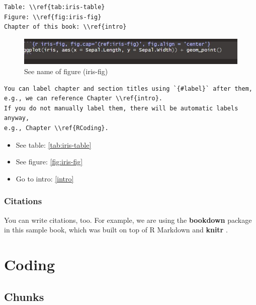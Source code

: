 \documentclass[
]{book}
\providecommand{\tightlist}{%
  \setlength{\itemsep}{0pt}\setlength{\parskip}{0pt}}
\begin{document}
\begin{verbatim}
Table: \\ref{tab:iris-table}
Figure: \\ref{fig:iris-fig}
Chapter of this book: \\ref{intro}
\end{verbatim}

\begin{figure}
\centering
\includegraphics{FigureCaption.jpg}
\caption{See name of figure (iris-fig)}
\end{figure}

\begin{verbatim}
You can label chapter and section titles using `{#label}` after them,  
e.g., we can reference Chapter \\ref{intro}.   
If you do not manually label them, there will be automatic labels anyway,  
e.g., Chapter \\ref{RCoding}.
\end{verbatim}

\begin{itemize}
\tightlist
\item
  See table: \ref{tab:iris-table}\\
\item
  See figure: \ref{fig:iris-fig}\\
\item
  Go to intro: \ref{intro}
\end{itemize}

\hypertarget{citations}{%
\subsection{Citations}\label{citations}}

You can write citations, too. For example, we are using the \textbf{bookdown} package \citep{R-bookdown} in this sample book, which was built on top of R Markdown and \textbf{knitr} \citep{xie2015}.

\hypertarget{RCoding}{%
\chapter{Coding}\label{RCoding}}

\hypertarget{chunks}{%
\section{Chunks}\label{chunks}}
\end{document}
